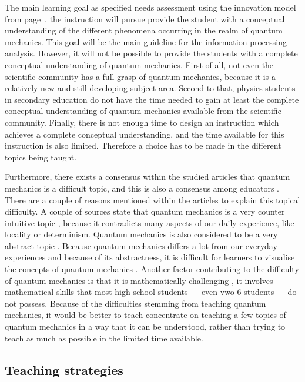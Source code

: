 \documentclass[11pt,twoside]{report} %
\begin{document}
The main learning goal as specified needs assessment using the innovation model from page~\pageref{sssec:needsassessmentinnovation}, the instruction will pursue provide the student with a conceptual understanding of the different phenomena occurring in the realm of quantum mechanics. This goal will be the main guideline for the information-processing analysis. However, it will not be possible to provide the students with a complete conceptual understanding of quantum mechanics. First of all, not even the scientific community has a full grasp of quantum mechanics, because it is a relatively new and still developing subject area. Second to that, physics students in secondary education do not have the time needed to gain at least the complete conceptual understanding of quantum mechanics available from the scientific community. Finally, there is not enough time to design an instruction which achieves a complete conceptual understanding, and the time available for this instruction is also limited. Therefore a choice has to be made in the different topics being taught.

Furthermore, there exists a consensus within the studied articles that quantum mechanics is a difficult topic, and this is also a consensus among educators \cite{gianino,papaphotis1,papaphotis2}. There are a couple of reasons mentioned within the articles to explain this topical difficulty. A couple of sources state that quantum mechanics is a very counter intuitive topic \cite{henriksen, levrini, mckagan, singh2}, because it contradicts many aspects of our daily experience, like locality or determinism. Quantum mechanics is also considered to be a very abstract topic \cite{barnes, gianino, mckagan, papaphotis1, singh1}. Because quantum mechanics differs a lot from our everyday experiences and because of its abstractness, it is difficult for learners to visualise the concepts of quantum mechanics \cite{henriksen, mckagan}. Another factor contributing to the difficulty of quantum mechanics is that it is mathematically challenging \cite{gianino, mckagan}, it involves mathematical skills that most high school students --- even vwo 6 students --- do not possess. Because of the difficulties stemming from teaching quantum mechanics, it would be better to teach concentrate on teaching a few topics of quantum mechanics in a way that it can be understood, rather than trying to teach as much as possible in the limited time available.

\subsection{Teaching strategies}
\end{document}
